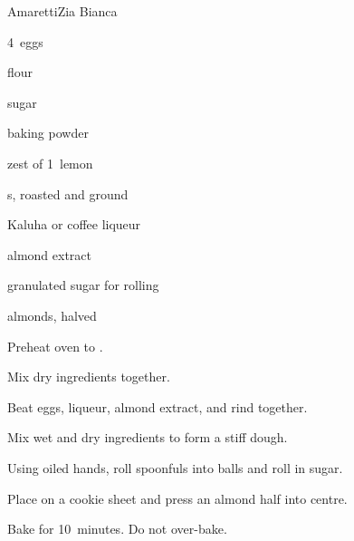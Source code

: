 \begin{recipe}{Amaretti}{Zia Bianca}{}

\begin{ingredients}
\item 4~eggs
\item {} flour
\item {} sugar
\item {} 
\item {} baking powder
\item zest of 1~lemon
\item {} s, roasted and ground
\item {} Kaluha or coffee liqueur
\item {} almond extract
\item granulated sugar for rolling
\item almonds, halved
\end{ingredients}

\begin{directions}
\item Preheat oven to .
\item Mix dry ingredients together.
\item Beat eggs, liqueur, almond extract, and rind together.
\item Mix wet and dry ingredients to form a stiff dough.
\item Using oiled hands, roll spoonfuls into balls and roll in sugar.
\item Place on a cookie sheet and press an almond half into centre.
\item Bake for 10~minutes. Do not over-bake.
\end{directions}

\end{recipe}
